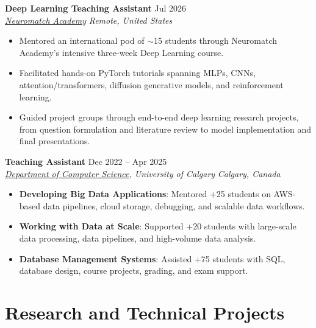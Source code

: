 \documentclass[a4paper,10pt]{article}
\newcommand{\resumeSubheading}[4]{
    \textbf{#1} \hfill #2 \\
    \textit{#3} \hfill \textit{#4}
}
\begin{document}
\resumeSubheading
{Deep Learning Teaching Assistant}
{Jul 2026}
{\href{https://neuromatch.io/}{Neuromatch Academy}}
{Remote, United States}
\begin{itemize}[leftmargin=0.25in]
    \item Mentored an international pod of $\sim$15 students through Neuromatch Academy's intensive three-week Deep Learning course.
    \item Facilitated hands-on PyTorch tutorials spanning MLPs, CNNs, attention/transformers, diffusion generative models, and reinforcement learning.
    \item Guided project groups through end-to-end deep learning research projects, from question formulation and literature review to model implementation and final presentations.
\end{itemize}

\resumeSubheading
{Teaching Assistant}
{Dec 2022 -- Apr 2025}
{\href{https://science.ucalgary.ca/computer-science} {Department of Computer Science}, University of Calgary}
{Calgary, Canada}
\begin{itemize}[leftmargin=0.25in]
    \item \textbf{Developing Big Data Applications}: Mentored +25 students on AWS-based data pipelines, cloud storage, debugging, and scalable data workflows.
    \item \textbf{Working with Data at Scale}: Supported +20 students with large-scale data processing, data pipelines, and high-volume data analysis.
    \item \textbf{Database Management Systems}: Assisted +75 students with SQL, database design, course projects, grading, and exam support.
\end{itemize}


\section*{Research and Technical Projects}
\end{document}
